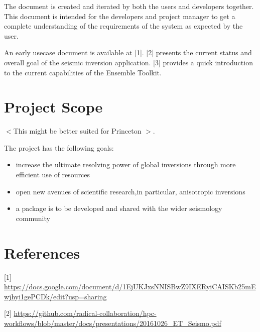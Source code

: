 \documentclass{scrreprt}
\begin{document}
The document is created and iterated by both the users and developers together. This document is intended for the developers and project manager to get a complete understanding of the requirements of the system as expected by the user.

An early usecase document is available at [1]. [2] presents the current status and overall goal of the seismic inversion application. [3] provides a quick introduction to the current capabilities of the Ensemble Toolkit.

\section{Project Scope}

$<$This might be better suited for Princeton $>$.

The project has the following goals:

\begin{itemize}
\item increase the ultimate resolving power of global inversions through more efficient use of resources
\item open new avenues of scientific research,in particular, anisotropic inversions
\item a package is to be developed and shared with the wider seismology community
\end{itemize}

\section{References}

[1] \url{https://docs.google.com/document/d/1EjUKJxsNNISBwZ9IXERyiCAISKb25mEwjhyi1gePCDk/edit?usp=sharing}

[2] \url{https://github.com/radical-collaboration/hpc-workflows/blob/master/docs/presentations/20161026_ET_Seismo.pdf}
\end{document}
